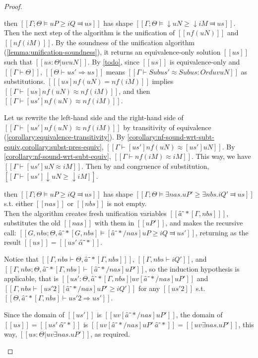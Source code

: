 \begin{proof}
\begin{caseof}
    \item \label{case:pos-subt-soundness:shift} 
      then
    $[[Γ ; Θ ⊨ uP ≥ iQ ⫤ us]]$ has shape $[[Γ;Θ ⊨ ↓uN ≥ ↓iM ⫤ us]]$.\\
    Then the next step of the algorithm is the unification of $[[nf(uN)]]$ and $[[nf(iM)]]$.
    By the soundness of the unification algorithm (\cref{lemma:unification-soundness}),
    it returns an equivalence-only solution $[[us]]$ such that $[[us : Θ | uv uN]]$.
    By \cref{todo}, since $[[us]]$ is equivalence-only and $[[Γ ⊢ Θ]]$, $[[Θ ⊢ us' ⇒ us]]$ means 
    $[[ Γ ⊢ Sub us' ≈ Sub us : Ord uv uN ]]$ as substitutions.
    $[[ [us]nf(uN) = nf(iM) ]]$ implies $[[Γ ⊢ [us]nf(uN) ≈ nf(iM)]]$, and then 
        $[[Γ ⊢ [us']nf(uN) ≈ nf(iM)]]$. 

        Let us rewrite the left-hand side and the right-hand side of $[[Γ ⊢ [us']nf(uN) ≈ nf(iM)]]$ by 
        transitivity of equivalence (\cref{corollary:equivalence-transitivity}).
        By \cref{corollary:nf-sound-wrt-subt-equiv,corollary:subst-pres-equiv},
        $[[Γ ⊢ [us']nf(uN) ≈ [us']uN ]]$. By \cref{corollary:nf-sound-wrt-subt-equiv}, 
        $[[Γ ⊢ nf(iM) ≈ iM ]]$. 
        This way, we have $[[Γ ⊢ [us']uN ≈ iM]]$.
        Then by 
        and congruence of substitution, $[[Γ ⊢ [us']↓uN ≥ ↓iM]]$.
    
    \item \label{case:pos-subt-soundness:exists}
        then
        $[[Γ ; Θ ⊨ uP ≥ iQ ⫤ us]]$ has shape $[[Γ;Θ ⊨ ∃nas.uP' ≥ ∃nbs.iQ' ⫤ us]]$ s.t. either $[[nas]]$ or $[[nbs]]$ is not empty.\\
        Then the algorithm creates fresh unification variables $[[â⁻*[Γ,nbs] ]]$, 
        substitutes the old $[[nas]]$ with them in $[[uP']]$, and makes the recursive call:
        $[[G, nbs; Θ, â⁻*[G, nbs] ⊨ [â⁻*/nas] uP ≥ iQ ⫤ us']]$, returning as the result
        $[[us]] = [[us' \ {α̂⁻*}]]$.

        Notice that $[[Γ, nbs ⊢ Θ, â⁻*[Γ, nbs] ]]$, $[[Γ,nbs ⊢ iQ']]$, and 
        $[[Γ,nbs; Θ, â⁻*[Γ, nbs] ⊢ [â⁻*/nas] uP' ]]$, so the induction hypothesis is applicable,
        that is $[[us' : Θ, â⁻*[Γ, nbs] | uv [â⁻*/nas]uP']]$ and $[[ Γ, nbs ⊢ [us'2][â⁻*/nas]uP' ≥ iQ' ]]$ for any
        $[[us'2]]$ s.t. $[[Θ, â⁻*[Γ, nbs] ⊢ us'2 ⇒ us']]$.

        Since the domain of $[[us']]$ is $[[uv [â⁻*/nas]uP']]$, the domain of 
        $[[us]] = [[us' \  {α̂⁻*}]]$ is $[[uv [â⁻*/nas]uP' \ {â⁻*}]] = [[uv ∃nas.uP']]$,
        this way, $[[us : Θ | uv ∃nas.uP']]$, as required.


\end{caseof}
\end{proof}
